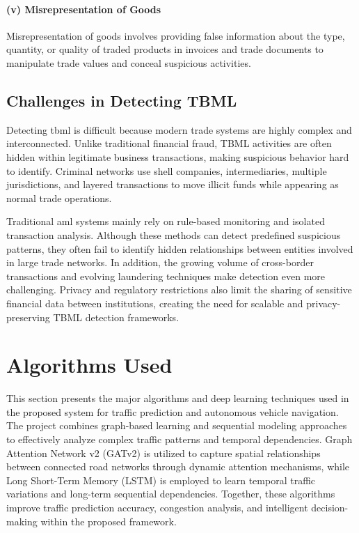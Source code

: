 \paragraph{\textbf{(v) Misrepresentation of Goods}}
Misrepresentation of goods involves providing false information about the type, quantity, or quality of traded products in invoices and trade documents to manipulate trade values and conceal suspicious activities.

\subsection[Challenges in Detecting TBML]{\textbf{Challenges in Detecting TBML}}
Detecting \gls{tbml} is difficult because modern trade systems are highly complex and interconnected. Unlike traditional financial fraud, TBML activities are often hidden within legitimate business transactions, making suspicious behavior hard to identify. Criminal networks use shell companies, intermediaries, multiple jurisdictions, and layered transactions to move illicit funds while appearing as normal trade operations.

Traditional \gls{aml} systems mainly rely on rule-based monitoring and isolated transaction analysis. Although these methods can detect predefined suspicious patterns, they often fail to identify hidden relationships between entities involved in large trade networks. In addition, the growing volume of cross-border transactions and evolving laundering techniques make detection even more challenging. Privacy and regulatory restrictions also limit the sharing of sensitive financial data between institutions, creating the need for scalable and privacy-preserving TBML detection frameworks.


\section{Algorithms Used}
This section presents the major algorithms and deep learning techniques used in the proposed system for traffic prediction and autonomous vehicle navigation. The project combines graph-based learning and sequential modeling approaches to effectively analyze complex traffic patterns and temporal dependencies. Graph Attention Network v2 (GATv2) is utilized to capture spatial relationships between connected road networks through dynamic attention mechanisms, while Long Short-Term Memory (LSTM) is employed to learn temporal traffic variations and long-term sequential dependencies. Together, these algorithms improve traffic prediction accuracy, congestion analysis, and intelligent decision-making within the proposed framework.

